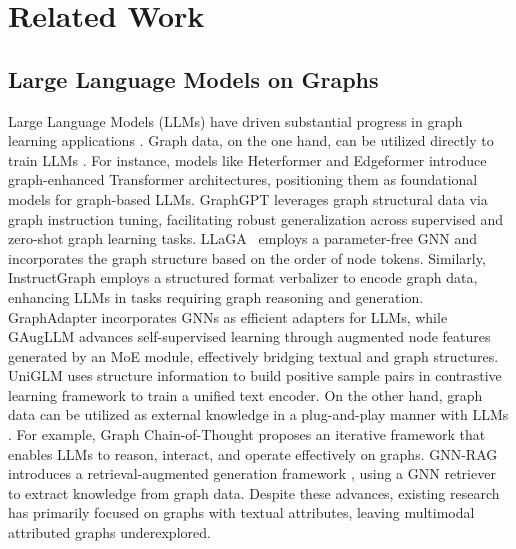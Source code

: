 \section{Related Work}\label{sec:relatedwork}

\subsection{Large Language Models on Graphs}
Large Language Models (LLMs) have driven substantial progress in graph learning applications \cite{jin2024large, ren2024survey}. Graph data, on the one hand, can be utilized directly to train LLMs \cite{chen2024graphwiz, zhang2023graph}. For instance, models like Heterformer \cite{jin2023heterformer} and Edgeformer \cite{ge2022edgeformer} introduce graph-enhanced Transformer architectures, positioning them as foundational models for graph-based LLMs. GraphGPT \cite{tang2024graphgpt} leverages graph structural data via graph instruction tuning, facilitating robust generalization across supervised and zero-shot graph learning tasks. LLaGA~\cite{chen2024llagalargelanguagegraph} employs a parameter-free GNN and incorporates the graph structure based on the order of node tokens. Similarly, InstructGraph \cite{wang2024instructgraph} employs a structured format verbalizer to encode graph data, enhancing LLMs in tasks requiring graph reasoning and generation. GraphAdapter \cite{huang2023can} incorporates GNNs as efficient adapters for LLMs, while GAugLLM \cite{fang2024gaugllm} advances self-supervised learning through augmented node features generated by an MoE module, effectively bridging textual and graph structures. UniGLM\cite{fang2024uniglmtrainingunifiedlanguage} uses structure information to build positive sample pairs in contrastive learning framework to train a unified text encoder. 
On the other hand, graph data can be utilized as external knowledge in a plug-and-play manner with LLMs \cite{jin2024graph, mavromatis2024gnn}. For example, Graph Chain-of-Thought \cite{jin2024graph} proposes an iterative framework that enables LLMs to reason, interact, and operate effectively on graphs. GNN-RAG \cite{mavromatis2024gnn} introduces a retrieval-augmented generation framework \cite{lewis2020retrieval}, using a GNN retriever to extract knowledge from graph data. Despite these advances, existing research has primarily focused on graphs with textual attributes, leaving multimodal attributed graphs underexplored.



